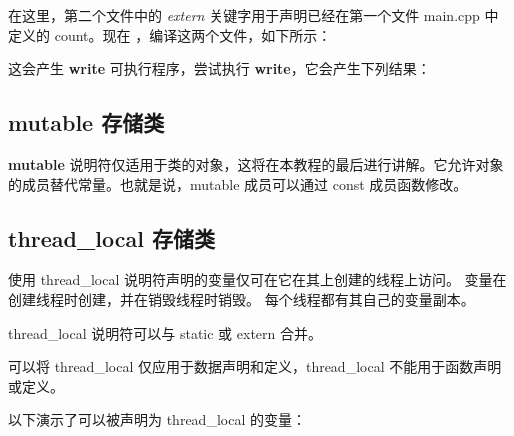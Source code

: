 \documentclass[
]{article}
\newenvironment{Shaded}{}{}
\newcommand{\DecValTok}[1]{\textcolor[rgb]{0.25,0.63,0.44}{#1}}
\newcommand{\ErrorTok}[1]{\textcolor[rgb]{1.00,0.00,0.00}{\textbf{#1}}}
\newcommand{\NormalTok}[1]{#1}
\newcommand{\OperatorTok}[1]{\textcolor[rgb]{0.40,0.40,0.40}{#1}}
\begin{document}
在这里，第二个文件中的 \emph{extern} 关键字用于声明已经在第一个文件
main.cpp 中定义的 count。现在 ，编译这两个文件，如下所示：

\begin{Shaded}
\end{Shaded}

这会产生 \textbf{write} 可执行程序，尝试执行
\textbf{write}，它会产生下列结果：

\begin{Shaded}
\end{Shaded}

\hypertarget{mutable-ux5b58ux50a8ux7c7b}{%
\subsection{mutable 存储类}\label{mutable-ux5b58ux50a8ux7c7b}}

\textbf{mutable}
说明符仅适用于类的对象，这将在本教程的最后进行讲解。它允许对象的成员替代常量。也就是说，mutable
成员可以通过 const 成员函数修改。

\hypertarget{thread_local-ux5b58ux50a8ux7c7b}{%
\subsection{thread\_local
存储类}\label{thread_local-ux5b58ux50a8ux7c7b}}

使用 thread\_local 说明符声明的变量仅可在它在其上创建的线程上访问。
变量在创建线程时创建，并在销毁线程时销毁。
每个线程都有其自己的变量副本。

thread\_local 说明符可以与 static 或 extern 合并。

可以将 thread\_local 仅应用于数据声明和定义，thread\_local
不能用于函数声明或定义。

以下演示了可以被声明为 thread\_local 的变量：
\end{document}

